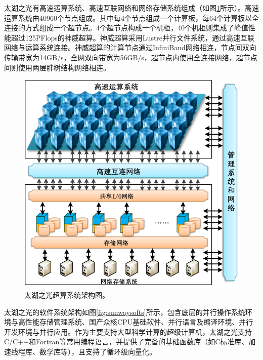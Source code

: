 \documentclass[degree=doctor]{thuthesis}
\begin{document}
\begin{table}[ht]
\centering
\caption{太湖之光超级计算机系统基础参数。}
\label{tb:sunwaystat}
\end{table}

太湖之光有高速运算系统、高速互联网络和网络存储系统组成（如图\ref{fig:sunwayarch}所示）。高速运算系统由40960个节点组成。其中每4个节点组成一个计算板，每64个计算板以全连接的方式组成一个超节点。4个超节点构成一个机柜，40个机柜则集成了峰值性能超过125PFlops的神威超算。神威超算采用Lustre并行文件系统，通过高速互联网络与运算系统连接。神威超算的计算节点通过InfiniBand网络相连，节点间双向传输带宽为14GB/s，全网双向带宽为56GB/s，超节点内使用全连接网络，超节点间则使用两层胖树结构网络相连。

\begin{figure}[ht]
\centering
\includegraphics[width=.8\columnwidth]{神威系统.png}
\caption{太湖之光超算系统架构图。}
\label{fig:sunwayarch}
\end{figure}

太湖之光的软件系统架构如图\ref{fig:sunwaysofts}所示，包含底层的并行操作系统环境与高性能存储管理系统、国产众核CPU基础软件、并行语言及编译环境、并行开发环境与并行应用。作为主要支持大型科学计算的超级计算机，太湖之光支持C/C++和Fortran等常用编程语言，并提供了完备的基础函数库（如C标准库、加速线程库、数学库等），且支持了循环级向量化。
\end{document}
